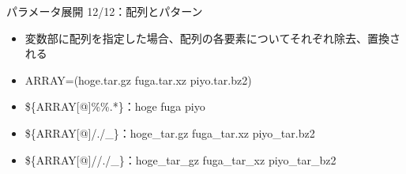\documentclass[12pt,aspectratio=169]{beamer}
\begin{document}
\begin{frame}{パラメータ展開 12/12：配列とパターン}

  \begin{itemize}
    \item 変数部に配列を指定した場合、配列の各要素についてそれぞれ除去、置換される
    \item ARRAY=(hoge.tar.gz fuga.tar.xz piyo.tar.bz2)
    \item \$\{ARRAY[@]\%\%.*\}：hoge fuga piyo
    \item \$\{ARRAY[@]/./\_\}：hoge\_tar.gz fuga\_tar.xz piyo\_tar.bz2
    \item \$\{ARRAY[@]//./\_\}：hoge\_tar\_gz fuga\_tar\_xz piyo\_tar\_bz2

  \end{itemize}

\end{frame}
\end{document}
